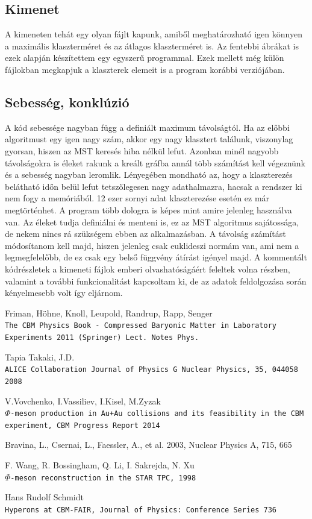 \documentclass[a4paper,12pt]{article}
\begin{document}
\subsection{ Kimenet}
\par A kimeneten tehát egy olyan fájlt kapunk, amiből meghatározható igen könnyen a maximális klaszterméret és az átlagos klaszterméret is.
Az fentebbi ábrákat is ezek alapján készítettem egy egyszerű programmal. Ezek mellett még külön fájlokban megkapjuk a klaszterek elemeit is
a program korábbi verziójában.
\subsection{ Sebesség, konklúzió}
\par A kód sebessége nagyban függ a definiált maximum távolságtól. Ha az előbbi algoritmust egy igen nagy szám,
akkor egy nagy klasztert találunk, viszonylag gyorsan, hiszen az MST keresés hiba nélkül lefut. Azonban minél nagyobb távolságokra is
éleket rakunk a kreált gráfba annál több számítást kell végeznünk és a sebesség nagyban leromlik. Lényegében mondható az, hogy a
klaszterezés belátható időn belül lefut tetszőlegesen nagy adathalmazra, hacsak a rendszer ki nem fogy a memóriából. 12 ezer sornyi adat 
klaszterezése esetén ez már megtörténhet. A program több dologra is képes mint amire jelenleg használva van. Az éleket tudja definiálni és
menteni is, ez az MST algoritmus sajátossága, de nekem nincs rá szükségem ebben az alkalmazásban. A távolság számítást módosítanom kell majd,
hiszen jelenleg csak euklideszi normám van, ami nem a legmegfelelőbb, de ez csak egy belső függvény átírást igényel majd. A kommentált kódrészletek 
a kimeneti fájlok emberi olvashatóságáért feleltek volna részben, valamint a további funkcionalitást kapcsoltam ki, de az adatok feldolgozása során
 kényelmesebb volt így eljárnom.
\begin{thebibliography}{9}
	Friman, Höhne, Knoll, Leupold, Randrup, Rapp, Senger
	\\\texttt{The CBM Physics Book - Compressed Baryonic Matter in Laboratory Experiments 2011 (Springer) Lect. Notes Phys.}
				
	 Tapia Takaki, J.D.
	 \\\texttt{ALICE Collaboration Journal of Physics G Nuclear Physics, 35, 044058 2008}
				
	 V.Vovchenko, I.Vassiliev, I.Kisel, M.Zyzak
	 \\\texttt{$\Phi$-meson production in Au+Au collisions and its feasibility in the CBM experiment, CBM Progress Report 2014}
				
	Bravina, L., Csernai, L., Faessler, A., et al. 2003, Nuclear Physics A, 715, 665 
				
	F. Wang, R. Bossingham, Q. Li, I. Sakrejda,  N. Xu 
	\\\texttt{$\Phi$-meson reconstruction in the STAR TPC, 1998}
				
	Hans Rudolf Schmidt
	\\\texttt{Hyperons at CBM-FAIR, Journal of Physics: Conference Series 736}
\end{thebibliography}
\end{document}
